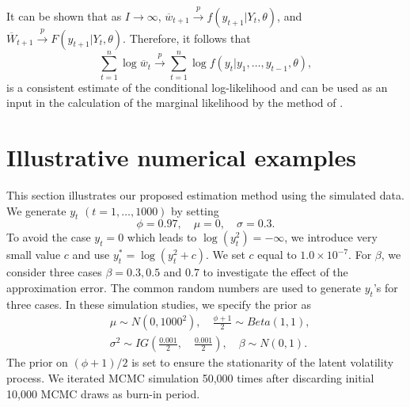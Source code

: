 \noindent
It can be shown that as $I \rightarrow \infty$, $\overline{w}_{t+1} \xrightarrow{p} f(y_{t+1}| Y_t, \theta)$, and $\overline{W}_{t+1} \xrightarrow{p} F(y_{t+1}| Y_t, \theta)$.
Therefore, it follows that
\begin{equation*}
    \sum_{t=1}^n \log \overline{w}_t \xrightarrow{p} \sum_{t=1}^n \log f(y_t| y_1, \dots, y_{t-1}, \theta), 
\end{equation*}
is a consistent estimate of the conditional log-likelihood and can be used as an input in the calculation of the marginal likelihood by the method of \cite{Chib(95)}. 
\section{Illustrative numerical examples}
\label{sec:Illustrative examples}
This section illustrates our proposed estimation method using the simulated data. We generate $y_t$ $(t = 1, \dots, 1000)$ by setting
\begin{equation*}
    \phi = 0.97, \quad
    \mu = 0, \quad
    \sigma = 0.3.
\end{equation*} 
To avoid the case $y_t = 0$ which leads to $\log (y_t^2) = -\infty$, we introduce very small value $c$ and use $y_t^* = \log (y_t^2 + c)$. 
We set $c$ equal to $1.0 \times 10^{-7}$.
For $\beta$, we consider three cases $\beta = 0.3, 0.5$ and $0.7$ to investigate the effect of the approximation error.
The common random numbers are used to generate $y_t$'s for three cases. 
In these simulation studies, we specify the prior as
\begin{align*}
    &\mu \sim N(0, 1000^2), \quad \frac{\phi + 1}{2} \sim Beta(1,1), 
    \\
    & \sigma^2 \sim IG\left( \frac{0.001}{2}, \quad 
    \frac{0.001}{2} \right), \quad 
     \beta  \sim N \left( 0, 1 \right).
\end{align*}
The prior on $(\phi+1)/2$ is set to ensure the stationarity of the latent volatility process. 
We iterated MCMC simulation 50,000 times after discarding initial 10,000 MCMC draws as burn-in period.
